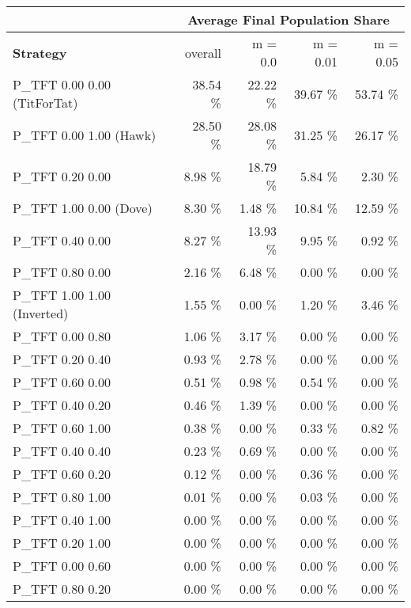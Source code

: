 \begin{tabular}{|l|r|r|r|r|}
\hline
 & \multicolumn{4}{c|}{{\bf Average Final Population Share}} \\
\hline
{\bf Strategy} & overall &  m = 0.0 & m = 0.01 & m = 0.05\\ \hline
P\_TFT 0.00 0.00 (TitForTat)  &   38.54 \%  &   22.22 \%  &   39.67 \%  &   53.74 \% \\
P\_TFT 0.00 1.00 (Hawk)       &   28.50 \%  &   28.08 \%  &   31.25 \%  &   26.17 \% \\
P\_TFT 0.20 0.00              &    8.98 \%  &   18.79 \%  &    5.84 \%  &    2.30 \% \\
P\_TFT 1.00 0.00 (Dove)       &    8.30 \%  &    1.48 \%  &   10.84 \%  &   12.59 \% \\
P\_TFT 0.40 0.00              &    8.27 \%  &   13.93 \%  &    9.95 \%  &    0.92 \% \\
P\_TFT 0.80 0.00              &    2.16 \%  &    6.48 \%  &    0.00 \%  &    0.00 \% \\
P\_TFT 1.00 1.00 (Inverted)   &    1.55 \%  &    0.00 \%  &    1.20 \%  &    3.46 \% \\
P\_TFT 0.00 0.80              &    1.06 \%  &    3.17 \%  &    0.00 \%  &    0.00 \% \\
P\_TFT 0.20 0.40              &    0.93 \%  &    2.78 \%  &    0.00 \%  &    0.00 \% \\
P\_TFT 0.60 0.00              &    0.51 \%  &    0.98 \%  &    0.54 \%  &    0.00 \% \\
P\_TFT 0.40 0.20              &    0.46 \%  &    1.39 \%  &    0.00 \%  &    0.00 \% \\
P\_TFT 0.60 1.00              &    0.38 \%  &    0.00 \%  &    0.33 \%  &    0.82 \% \\
P\_TFT 0.40 0.40              &    0.23 \%  &    0.69 \%  &    0.00 \%  &    0.00 \% \\
P\_TFT 0.60 0.20              &    0.12 \%  &    0.00 \%  &    0.36 \%  &    0.00 \% \\
P\_TFT 0.80 1.00              &    0.01 \%  &    0.00 \%  &    0.03 \%  &    0.00 \% \\
P\_TFT 0.40 1.00              &    0.00 \%  &    0.00 \%  &    0.00 \%  &    0.00 \% \\
P\_TFT 0.20 1.00              &    0.00 \%  &    0.00 \%  &    0.00 \%  &    0.00 \% \\
P\_TFT 0.00 0.60              &    0.00 \%  &    0.00 \%  &    0.00 \%  &    0.00 \% \\
P\_TFT 0.80 0.20              &    0.00 \%  &    0.00 \%  &    0.00 \%  &    0.00 \% \\

\end{tabular}
